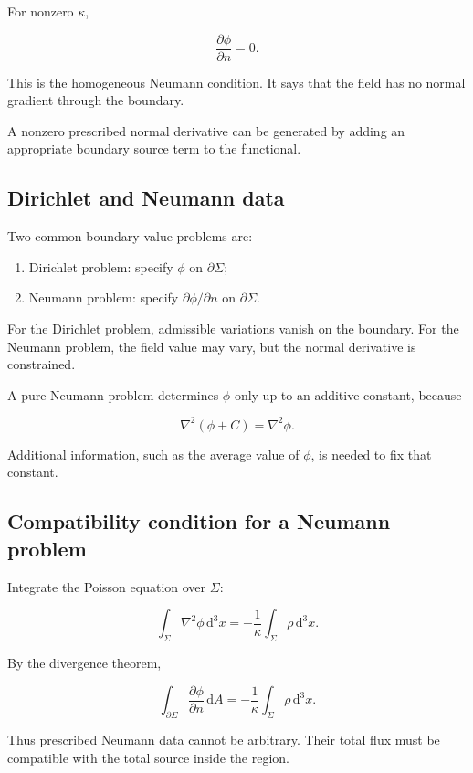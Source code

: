 For nonzero \(\kappa\),

\[
\frac{\partial\phi}{\partial n}=0.
\]

This is the homogeneous Neumann condition. It says that the field has no normal gradient through the boundary.

A nonzero prescribed normal derivative can be generated by adding an appropriate boundary source term to the functional.

\subsection{Dirichlet and Neumann data}

Two common boundary-value problems are:

\begin{enumerate}
    \item Dirichlet problem: specify \(\phi\) on \(\partial\Sigma\);
    \item Neumann problem: specify \(\partial\phi/\partial n\) on \(\partial\Sigma\).
\end{enumerate}

For the Dirichlet problem, admissible variations vanish on the boundary. For the Neumann problem, the field value may vary, but the normal derivative is constrained.

A pure Neumann problem determines \(\phi\) only up to an additive constant, because

\[
\nabla^{2}(\phi+C)
=
\nabla^{2}\phi.
\]

Additional information, such as the average value of \(\phi\), is needed to fix that constant.

\subsection{Compatibility condition for a Neumann problem}

Integrate the Poisson equation over \(\Sigma\):

\[
\int_{\Sigma}
\nabla^{2}\phi
\,\mathrm{d}^{3}x
=
-\frac{1}{\kappa}
\int_{\Sigma}
\rho
\,\mathrm{d}^{3}x.
\]

By the divergence theorem,

\[
\int_{\partial\Sigma}
\frac{\partial\phi}{\partial n}
\,\mathrm{d}A
=
-\frac{1}{\kappa}
\int_{\Sigma}
\rho
\,\mathrm{d}^{3}x.
\]

Thus prescribed Neumann data cannot be arbitrary. Their total flux must be compatible with the total source inside the region.

